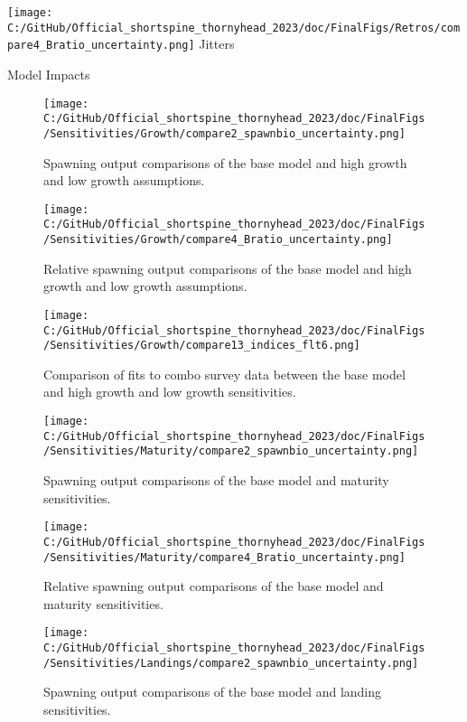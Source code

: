 \documentclass[11pt,
  english,
  letterpaper,
]{article}
\begin{document}
\texttt{[image: C:/GitHub/Official\_shortspine\_thornyhead\_2023/doc/FinalFigs/Retros/compare4\_Bratio\_uncertainty.png]} Jitters

Model Impacts

\begin{figure}
\centering
\texttt{[image: C:/GitHub/Official\_shortspine\_thornyhead\_2023/doc/FinalFigs/Sensitivities/Growth/compare2\_spawnbio\_uncertainty.png]}
\caption{Spawning output comparisons of the base model and high growth and low growth assumptions.\label{fig:growth_sensitiv_spawning}}
\end{figure}

\begin{figure}
\centering
\texttt{[image: C:/GitHub/Official\_shortspine\_thornyhead\_2023/doc/FinalFigs/Sensitivities/Growth/compare4\_Bratio\_uncertainty.png]}
\caption{Relative spawning output comparisons of the base model and high growth and low growth assumptions.\label{fig:growth_sensitiv_mngmt}}
\end{figure}

\begin{figure}
\centering
\texttt{[image: C:/GitHub/Official\_shortspine\_thornyhead\_2023/doc/FinalFigs/Sensitivities/Growth/compare13\_indices\_flt6.png]}
\caption{Comparison of fits to combo survey data between the base model and high growth and low growth sensitivities.\label{fig:growth_sensitiv_indx}}
\end{figure}

\begin{figure}
\centering
\texttt{[image: C:/GitHub/Official\_shortspine\_thornyhead\_2023/doc/FinalFigs/Sensitivities/Maturity/compare2\_spawnbio\_uncertainty.png]}
\caption{Spawning output comparisons of the base model and maturity sensitivities.\label{fig:mat_sensitiv_spawning}}
\end{figure}

\begin{figure}
\centering
\texttt{[image: C:/GitHub/Official\_shortspine\_thornyhead\_2023/doc/FinalFigs/Sensitivities/Maturity/compare4\_Bratio\_uncertainty.png]}
\caption{Relative spawning output comparisons of the base model and maturity sensitivities.\label{fig:mat_sensitiv_mngmt}}
\end{figure}

\begin{figure}
\centering
\texttt{[image: C:/GitHub/Official\_shortspine\_thornyhead\_2023/doc/FinalFigs/Sensitivities/Landings/compare2\_spawnbio\_uncertainty.png]}
\caption{Spawning output comparisons of the base model and landing sensitivities.\label{fig:land_sensitiv_spawning}}
\end{figure}
\end{document}

